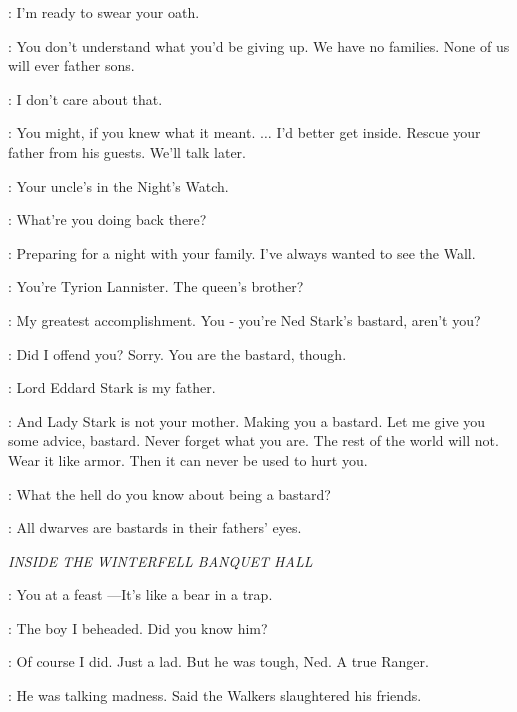 \JON: I'm ready to swear your oath. 

\BENJEN: You don't understand what you'd be giving up. We have no families. None of us will ever father sons. 

\JON: I don't care about that. 

\BENJEN: You might, if you knew what it meant. $\ldots$ I'd better get inside. Rescue your father from his guests. We'll talk later. 


\TYRION: Your uncle's in the Night's Watch. 

\JON: What're you doing back there? 

\TYRION: Preparing for a night with your family. I've always wanted to see the Wall. 

\JON: You're Tyrion Lannister. The queen's brother? 

\TYRION: My greatest accomplishment. You - you're Ned Stark's bastard, aren't you? 


\TYRION: Did I offend you? Sorry. You are the bastard, though. 

\JON: Lord Eddard Stark is my father. 

\TYRION: And Lady Stark is not your mother. Making you a bastard. Let me give you some advice, bastard. Never forget what you are. The rest of the world will not. Wear it like armor. Then it can never be used to hurt you. 

\JON: What the hell do you know about being a bastard? 

\TYRION: All dwarves are bastards in their fathers' eyes. 



\scene

\textit{INSIDE THE WINTERFELL BANQUET HALL} 


\BENJEN: You at a feast ---It's like a bear in a trap. 

\NED: The boy I beheaded. Did you know him? 

\BENJEN: Of course I did. Just a lad. But he was tough, Ned. A true Ranger. 

\NED: He was talking madness. Said the Walkers slaughtered his friends. 

